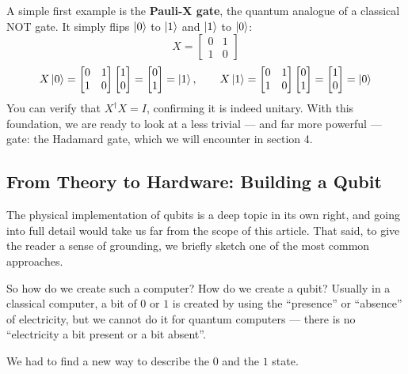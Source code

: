 A simple first example is the \textbf{Pauli-X gate}, the quantum analogue of
a classical NOT gate. It simply flips $\ket{0}$ to $\ket{1}$ and $\ket{1}$
to $\ket{0}$:
$$
X = \begin{bmatrix} 0 & 1 \\ 1 & 0 \end{bmatrix}
$$
$$
X\ket{0} = \begin{bmatrix} 0 & 1 \\ 1 & 0 \end{bmatrix}
\begin{bmatrix} 1 \\ 0 \end{bmatrix} = \begin{bmatrix} 0 \\ 1 \end{bmatrix}
= \ket{1}, \qquad
X\ket{1} = \begin{bmatrix} 0 & 1 \\ 1 & 0 \end{bmatrix}
\begin{bmatrix} 0 \\ 1 \end{bmatrix} = \begin{bmatrix} 1 \\ 0 \end{bmatrix}
= \ket{0}
$$
You can verify that $X^\dagger X = I$, confirming it is indeed unitary. With
this foundation, we are ready to look at a less trivial --- and far more
powerful --- gate: the Hadamard gate, which we will encounter in section 4.

\subsection{From Theory to Hardware: Building a Qubit}

The physical implementation of qubits is a deep topic in its own right, and
going into full detail would take us far from the scope of this article. That
said, to give the reader a sense of grounding, we briefly sketch one of the
most common approaches.

So how do we create such a computer? How do we create a qubit? Usually in a
classical computer, a bit of $0$ or $1$ is created by using the ``presence''
or ``absence'' of electricity, but we cannot do it for quantum computers ---
there is no ``electricity a bit present or a bit absent''.

We had to find a new way to describe the $0$ and the $1$ state.

